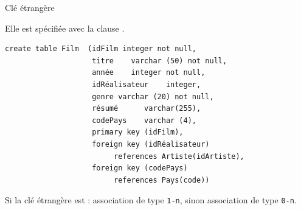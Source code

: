 \begin{frame}[fragile]{Clé étrangère}

Elle est spécifiée avec la clause  .

\vfill
\begin{verbatim}
create table Film  (idFilm integer not null, 
                    titre    varchar (50) not null,
                    année    integer not null,
                    idRéalisateur    integer,
                    genre varchar (20) not null,
                    résumé      varchar(255),
                    codePays    varchar (4),
                    primary key (idFilm),
                    foreign key (idRéalisateur) 
                         references Artiste(idArtiste),
                    foreign key (codePays) 
                         references Pays(code))
\end{verbatim}

\vfill

\begin{blocgauche}
Si la clé étrangère est : association de type \texttt{1-n},
sinon association de type \texttt{0-n}.
\end{blocgauche}
\end{frame}



